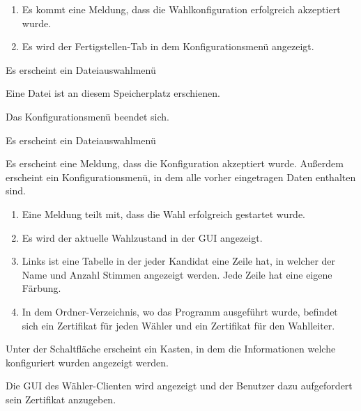 \documentclass[parskip=full]{scrartcl}
\begin{document}
		{\begin{enumerate}
				\item Es kommt eine Meldung, dass die Wahlkonfiguration erfolgreich akzeptiert wurde.
				\item Es wird der Fertigstellen-Tab in dem Konfigurationsmenü angezeigt.
		\end{enumerate}}

		{Es erscheint ein Dateiauswahlmenü}

		{Eine Datei ist an diesem Speicherplatz erschienen.}

		{Das Konfigurationsmenü beendet sich.}

		{Es erscheint ein Dateiauswahlmenü}

		{Es erscheint eine Meldung, dass die Konfiguration akzeptiert wurde. Außerdem erscheint ein Konfigurationsmenü, in dem alle vorher eingetragen Daten enthalten sind.}

		{\begin{enumerate}
				\item Eine Meldung teilt mit, dass die Wahl erfolgreich gestartet wurde.
				\item Es wird der aktuelle Wahlzustand in der GUI angezeigt.
				\item Links ist eine Tabelle in der jeder Kandidat eine Zeile hat, in welcher der Name und Anzahl Stimmen angezeigt werden. Jede Zeile hat eine eigene Färbung.
				\item In dem Ordner-Verzeichnis, wo das Programm ausgeführt wurde, befindet sich ein Zertifikat für jeden Wähler und ein Zertifikat für den Wahlleiter.
		\end{enumerate}}

		{Unter der Schaltfläche erscheint ein Kasten, in dem die Informationen welche konfiguriert wurden angezeigt werden.}

		{Die GUI des Wähler-Clienten wird angezeigt und der Benutzer dazu aufgefordert sein Zertifikat anzugeben.}
\end{document}
